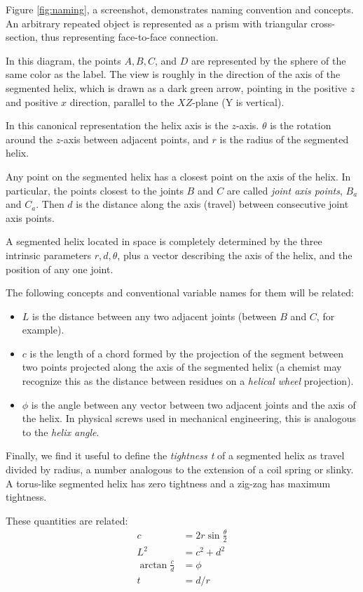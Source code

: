 \documentclass{svproc}
\begin{document}
Figure \ref{fig:naming}, a screenshot, demonstrates naming convention and concepts.
An arbitrary repeated object is represented as a prism
with triangular cross-section,
thus representing face-to-face connection.

In this diagram, the
points $A,B,C$, and $D$ are represented by the sphere of the same color as the label. The view is roughly in the direction of
the axis of the segmented helix, which is drawn as a dark green arrow, pointing in the positive $z$ and positive $x$ direction,
parallel to the $XZ$-plane (Y is vertical).

In this canonical representation the helix axis is
the $z$-axis.
$\theta$ is the rotation around the $z$-axis
between adjacent points, and
$r$ is the radius of the segmented helix.

Any point on the segmented helix has a closest point on the axis of the helix.
In particular, the points closest to the
joints $B$ and $C$ are called {\em joint axis points}, $B_a$ and $C_a$.
Then $d$ is the distance along the axis (travel) between consecutive joint axis points.

A segmented helix located in space is completely determined by
the three intrinsic parameters $r,d,\theta$, plus
a vector describing the axis
of the helix, and the position of any one joint.

The following concepts and conventional variable names for them will be related:
\begin{itemize}
\item $L$ is the distance between any two adjacent joints (between $B$ and $C$, for example).
  \item $c$ is the length of a chord formed by the projection of the segment between two points projected along the axis of the segmented helix (a chemist may recognize this as the distance between residues on a {\em helical wheel} projection).
\item $\phi$ is the angle between any vector between two adjacent joints and the axis of the helix. In physical screws used in mechanical engineering, this is analogous to the {\em helix angle}.
  \end{itemize}
Finally, we find it useful to define the {\em tightness t} of a segmented helix
as travel divided by radius, a number
analogous to the extension of a coil spring or slinky.
A torus-like segmented helix has zero tightness and a zig-zag has
maximum tightness.

These quantities are related:
\begin{align}
    c &= 2r\sin{\frac{\theta}{2}} \\
    L^2 &= c^2+d^2  \\
    \arctan{\frac{c}{d}}  &= \phi \\
    t &= d / r
\end{align}
\end{document}
